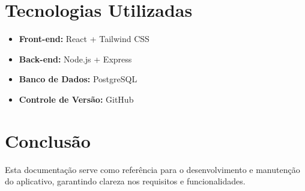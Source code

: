 \documentclass[12pt,a4paper]{report}
\begin{document}
\chapter{Tecnologias Utilizadas}
\begin{itemize}
    \item \textbf{Front-end:} React + Tailwind CSS
    \item \textbf{Back-end:} Node.js + Express
    \item \textbf{Banco de Dados:} PostgreSQL
    \item \textbf{Controle de Versão:} GitHub
\end{itemize}

\chapter{Conclusão}
Esta documentação serve como referência para o desenvolvimento e manutenção do aplicativo, garantindo clareza nos requisitos e funcionalidades.
\end{document}
